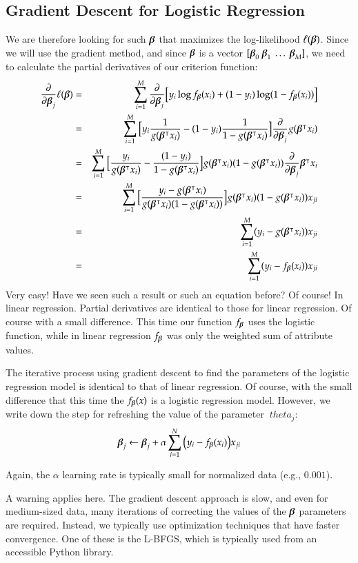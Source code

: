 \begin{refsection}
\section{Gradient Descent for Logistic Regression}
We are therefore looking for such $\boldsymbol{\beta}$ that maximizes the log-likelihood $\ell(\boldsymbol{\beta})$. Since we will use the gradient method, and since $\boldsymbol{\beta}$ is a vector $[\betas_0\ \betas_1\ \ldots\ \betas_M] $, we need to calculate the partial derivatives of our criterion function:
\begin{eqnarray}
  \frac{\partial}{\partial\boldsymbol{\beta}_j}\ell(\boldsymbol{\beta})
  & = & \sum_{i=1}^M \frac{\partial}{\partial\boldsymbol{\beta}_j} \big[y_i\log f_{\boldsymbol{\beta}}(x_i)+(1-y_i)\log (1-f_{\boldsymbol{\beta}}(x_i)) \big] \nonumber \\
  & = & \sum_{i=1}^M \big[y_i\frac{1}{g(\boldsymbol{\beta}^\intercal x_i)}-(1-y_i)\frac{1}{1-g(\boldsymbol{\beta}^\intercal x_i)} \big]\frac{\partial}{\partial\boldsymbol{\beta}_j}g(\boldsymbol{\beta}^\intercal x_i) \nonumber\\
  & = & \sum_{i=1}^M \big[\frac{y_i}{g(\boldsymbol{\beta}^\intercal x_i)}-\frac{(1-y_i)}{1-g(\boldsymbol{\beta}^\intercal x_i)} \big]g(\boldsymbol{\beta}^\intercal x_i)(1-g(\boldsymbol{\beta}^\intercal x_i))
  \frac{\partial}{\partial\boldsymbol{\beta}_j}\boldsymbol{\beta}^\intercal x_i\nonumber\\
  & = & \sum_{i=1}^M \big[\frac{y_i - g(\boldsymbol{\beta}^\intercal x_i)} {g(\boldsymbol{\beta}^\intercal x_i)(1-g(\boldsymbol{\beta}^\intercal x_i))} \big]g(\boldsymbol{\beta}^\intercal x_i)(1-g(\boldsymbol{\beta}^\intercal x_i)) x_{ji}\nonumber\\
  & = & \sum_{i=1}^M (y_i-g(\boldsymbol{\beta}^\intercal x_i))x_{ji}\nonumber\\
  & = & \sum_{i=1}^M (y_i-f_{\boldsymbol{\beta}}(x_i))x_{ji}
  \label{eq:logreg-grad}
\end{eqnarray}
Very easy! Have we seen such a result or such an equation before? Of course! In linear regression. Partial derivatives are identical to those for linear regression. Of course with a small difference. This time our function $f_{\boldsymbol{\beta}}$ uses the logistic function, while in linear regression $f_{\boldsymbol{\beta}}$ was only the weighted sum of attribute values.

The iterative process using gradient descent to find the parameters of the logistic regression model is identical to that of linear regression. Of course, with the small difference that this time the $ f_{\boldsymbol{\beta}}(x)$ is a logistic regression model. However, we write down the step for refreshing the value of the parameter $ \ theta_j $:
\begin{equation}
  \boldsymbol{\beta}_j\leftarrow\boldsymbol{\beta}_j+\alpha\sum_{i=1}^{N}\big(y_i-f_{\boldsymbol{\beta}}(x_i)\big) x_{ji}
\end{equation}

Again, the $\alpha$ learning rate is typically small for normalized data (e.g., $0.001$).

A warning applies here. The gradient descent approach is slow, and even for medium-sized data, many iterations of correcting the values of the $\boldsymbol{\beta}$ parameters are required. Instead, we typically use optimization techniques that have faster convergence. One of these is the L-BFGS, which is typically used from an accessible Python library.

\printbibliography[heading=subbibliography]
\end{refsection}

